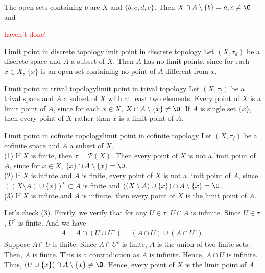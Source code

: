 The open sets containing $b$ are $X$ and $\{b,c,d,e\}$. Then $X\cap A\setminus \{b\} = {a,c}\neq \O$ and 
\par
\textcolor{red}{haven't done!}

\begin{example}{Limit point in discrete topology}{limit point in discrete topology}
    Let $(X,\tau_d)$ be a discrete space and $A$ a subset of $X$. 
    Then $A$ has no limit points, since for each $x\in X$, 
    $\{x\}$ is an open set containing no point of $A$ different from $x$.
\end{example}

\begin{example}{Limit point in trival topology}{limit point in trival topology}
    Let $(X,\tau_t)$ be a trival space and $A$ a subset of $X$ with at least two elements. Every point of $X$ is a limit point of $A$, 
    since for each $x\in X$, $X\cap A\setminus\{x\}\neq\O$. If $A$ is single set $\{x\}$, then every point of $X$ rather than $x$ is a limit point of $A$.
\end{example}

\begin{example}{Limit point in cofinite topology}{limit point in cofinite topology}
    Let $(X,\tau_f)$ be a cofinite space and $A$ a subset of $X$. \\
    (1) If $X$ is finite, then $\tau = \mathcal{P}(X)$. Then every point of $X$ is not a limit point of $A$, since for $x\in X$, $\{x\} \cap A\setminus\{x\}=\O$.\\
    (2) If $X$ is infinte and $A$ is finite, every point of $X$ is not a limit point of $A$, since $((X\setminus A) \cup\{x\})^c\subset A$ is finite and $((X\setminus A) \cup\{x\})\cap A\setminus \{x\}=\O$.\\
    (3) If $X$ is infinte and $A$ is infinite, then every point of $X$ is the limit point of $A$.
\end{example}
    Let's check (3). Firstly, we verify that for any $U\in \tau$, $U\cap A$ is infinite. Since $U\in\tau$, $U^c$ is finite. And
    we have 
    \begin{align*}
        A = A\cap(U\cup U^c) = (A\cap U)\cup (A\cap U^c).
    \end{align*}
    Suppose $A\cap U$ is finite. Since $A\cap U^c$ is finite,
    $A$ is the union of two finite sets. Then, $A$ is finite. This is a contradiction as $A$ is infinite.
    Hence, $A\cap U$ is infinite.
    Thus, $(U\cup \{x\})\cap A\setminus\{x\}\neq \O$. Hence, every point of $X$ is the limit point of $A$.


